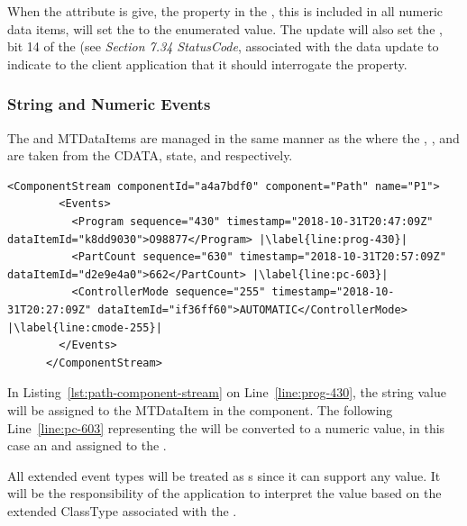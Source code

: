 When the  attribute is give, the property in the , this is included in all numeric data items, will set the  to the enumerated value. The update will also set the , bit 14 of the  (see \cite{UAPart4} \textit{Section 7.34 StatusCode}, associated with the data update to indicate to the client application that it should interrogate the  property. 

\subsubsection{String and Numeric Events}\label{sec:sting-numeric-events}

The  and  \glspl{MTDataItem} are managed in the same manner as the  where the , , and  are taken from the \gls{CDATA},  state, and  respectively.

\begin{lstlisting}[firstnumber=last,escapechar=|,%
    caption={Path Component Stream},label={lst:path-component-stream}]
      <ComponentStream componentId="a4a7bdf0" component="Path" name="P1">
        <Events>
          <Program sequence="430" timestamp="2018-10-31T20:47:09Z" dataItemId="k8dd9030">O98877</Program> |\label{line:prog-430}|
          <PartCount sequence="630" timestamp="2018-10-31T20:57:09Z" dataItemId="d2e9e4a0">662</PartCount> |\label{line:pc-603}|
          <ControllerMode sequence="255" timestamp="2018-10-31T20:27:09Z" dataItemId="if36ff60">AUTOMATIC</ControllerMode> |\label{line:cmode-255}|
        </Events>
      </ComponentStream>
\end{lstlisting}

In Listing~\ref{lst:path-component-stream} on Line~\ref{line:prog-430}, the string value will be assigned to the  \gls{MTDataItem} in the  component. The following Line~\ref{line:pc-603} representing the  will be converted to a numeric value, in this case an  and assigned to the .

All extended event types will be treated as s since it can support any value. It will be the responsibility of the application to interpret the value based on the extended \gls{ClassType} associated with the .

